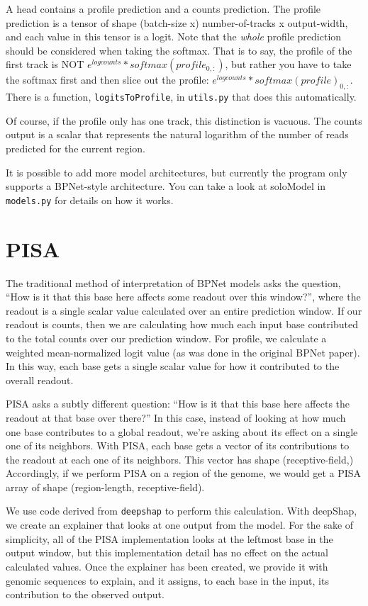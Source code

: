 \documentclass{article}
\begin{document}
A head contains a profile prediction and a counts prediction. The profile prediction is a tensor
of shape (batch-size x) number-of-tracks x output-width, and each value in this tensor is a logit.
Note that the \emph{whole} profile prediction should be considered when taking the softmax.
That is to say, the profile of the first track is NOT $e^{logcounts} * softmax(profile_{0,:})$,
but rather you have to take the softmax first and then slice out the profile:
$e^{logcounts} * softmax(profile)_{0,:}$. There is a function, \texttt{logitsToProfile}, in
\texttt{utils.py} that does this automatically.

Of course, if the profile only has one track, this distinction is vacuous.
The counts output is a scalar that represents the natural logarithm of the number of reads
predicted for the current region.

It is possible to add more model architectures, but currently the program only supports a
BPNet-style architecture.
You can take a look at soloModel in \texttt{models.py} for details on how it works.

\section{PISA}
The traditional method of interpretation of BPNet models asks the question,
``How is it that this base here affects some readout over this window?'',
where the readout is a single scalar value calculated over an entire prediction window.
If our readout is counts, then we are calculating how much each input base contributed to the
total counts over our prediction window. For profile, we calculate a weighted mean-normalized
logit value (as was done in the original BPNet paper). In this way, each base gets a single scalar
value for how it contributed to the overall readout.

PISA asks a subtly different question:
``How is it that this base here affects the readout at that base over there?''
In this case, instead of looking at how much one base contributes to a global readout, we're
asking about its effect on a single one of its neighbors. With PISA, each base gets a vector of
its contributions to the readout at each one of its neighbors.
This vector has shape (receptive-field,)
Accordingly, if we perform PISA on a region of the genome, we would get a PISA array of shape
(region-length, receptive-field).

We use code derived from \texttt{deepshap} to perform this calculation. With deepShap, we create
an explainer that looks at one output from the model. For the sake of simplicity, all of the PISA
implementation looks at the leftmost base in the output window, but this implementation detail
has no effect on the actual calculated values.
Once the explainer has been created, we provide it with genomic sequences to explain, and it
assigns, to each base in the input, its contribution to the observed output.
\end{document}
